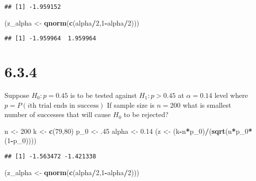 \documentclass[]{article}
\newenvironment{Shaded}{\begin{snugshade}}{\end{snugshade}}
\newcommand{\KeywordTok}[1]{\textcolor[rgb]{0.13,0.29,0.53}{\textbf{#1}}}
\newcommand{\DecValTok}[1]{\textcolor[rgb]{0.00,0.00,0.81}{#1}}
\newcommand{\FloatTok}[1]{\textcolor[rgb]{0.00,0.00,0.81}{#1}}
\newcommand{\StringTok}[1]{\textcolor[rgb]{0.31,0.60,0.02}{#1}}
\newcommand{\OperatorTok}[1]{\textcolor[rgb]{0.81,0.36,0.00}{\textbf{#1}}}
\newcommand{\NormalTok}[1]{#1}
\begin{document}
\begin{verbatim}
## [1] -1.959152
\end{verbatim}

\begin{Shaded}
\begin{Highlighting}[]
\NormalTok{(z_alpha <-}\StringTok{ }\KeywordTok{qnorm}\NormalTok{(}\KeywordTok{c}\NormalTok{(alpha}\OperatorTok{/}\DecValTok{2}\NormalTok{,}\DecValTok{1}\OperatorTok{-}\NormalTok{alpha}\OperatorTok{/}\DecValTok{2}\NormalTok{)))}
\end{Highlighting}
\end{Shaded}

\begin{verbatim}
## [1] -1.959964  1.959964
\end{verbatim}

\section{6.3.4}\label{section-5}

Suppose \(H_0:p=0.45\) is to be tested against \(H_1:p>0.45\) at
\(\alpha=0.14\) level where \(p=P(i \text{th trial ends in success})\)
If sample size is \(n=200\) what is smallest number of successes that
will cause \(H_0\) to be rejected?

\begin{Shaded}
\begin{Highlighting}[]
\NormalTok{n <-}\StringTok{ }\DecValTok{200}
\NormalTok{k <-}\StringTok{ }\KeywordTok{c}\NormalTok{(}\DecValTok{79}\NormalTok{,}\DecValTok{80}\NormalTok{)}
\NormalTok{p_}\DecValTok{0}\NormalTok{ <-}\StringTok{ }\NormalTok{.}\DecValTok{45}
\NormalTok{alpha <-}\StringTok{ }\FloatTok{0.14}
\NormalTok{(z <-}\StringTok{ }\NormalTok{(k}\OperatorTok{-}\NormalTok{n}\OperatorTok{*}\NormalTok{p_}\DecValTok{0}\NormalTok{)}\OperatorTok{/}\NormalTok{(}\KeywordTok{sqrt}\NormalTok{(n}\OperatorTok{*}\NormalTok{p_}\DecValTok{0}\OperatorTok{*}\NormalTok{(}\DecValTok{1}\OperatorTok{-}\NormalTok{p_}\DecValTok{0}\NormalTok{))))}
\end{Highlighting}
\end{Shaded}

\begin{verbatim}
## [1] -1.563472 -1.421338
\end{verbatim}

\begin{Shaded}
\begin{Highlighting}[]
\NormalTok{(z_alpha <-}\StringTok{ }\KeywordTok{qnorm}\NormalTok{(}\KeywordTok{c}\NormalTok{(alpha}\OperatorTok{/}\DecValTok{2}\NormalTok{,}\DecValTok{1}\OperatorTok{-}\NormalTok{alpha}\OperatorTok{/}\DecValTok{2}\NormalTok{)))}
\end{Highlighting}
\end{Shaded}
\end{document}
